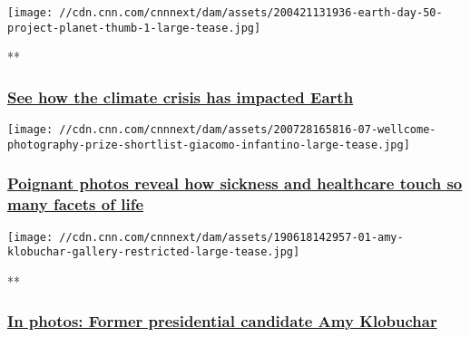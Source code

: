 \href{/videos/weather/2020/04/20/earth-day-50-project-planet-orig.cnn}{}

\texttt{[image: //cdn.cnn.com/cnnnext/dam/assets/200421131936-earth-day-50-project-planet-thumb-1-large-tease.jpg]}

**

\hypertarget{see-how-the-climate-crisis-has-impacted-earth}{%
\subsubsection{\texorpdfstring{\href{/videos/weather/2020/04/20/earth-day-50-project-planet-orig.cnn}{See
how the climate crisis has impacted
Earth}}{See how the climate crisis has impacted Earth}}\label{see-how-the-climate-crisis-has-impacted-earth}}

\href{/style/article/wellcome-photography-prize-shortlist-wellness/index.html}{}

\texttt{[image: //cdn.cnn.com/cnnnext/dam/assets/200728165816-07-wellcome-photography-prize-shortlist-giacomo-infantino-large-tease.jpg]}

\hypertarget{poignant-photos-reveal-how-sickness-and-healthcare-touch-so-many-facets-of-life}{%
\subsubsection{\texorpdfstring{\href{/style/article/wellcome-photography-prize-shortlist-wellness/index.html}{Poignant
photos reveal how sickness and healthcare touch so many facets of
life}}{Poignant photos reveal how sickness and healthcare touch so many facets of life}}\label{poignant-photos-reveal-how-sickness-and-healthcare-touch-so-many-facets-of-life}}

\href{/2019/06/18/politics/gallery/amy-klobuchar/index.html}{}

\texttt{[image: //cdn.cnn.com/cnnnext/dam/assets/190618142957-01-amy-klobuchar-gallery-restricted-large-tease.jpg]}

**

\hypertarget{in-photos-former-presidential-candidate-amy-klobuchar}{%
\subsubsection{\texorpdfstring{\href{/2019/06/18/politics/gallery/amy-klobuchar/index.html}{In
photos: Former presidential candidate Amy
Klobuchar}}{In photos: Former presidential candidate Amy Klobuchar}}\label{in-photos-former-presidential-candidate-amy-klobuchar}}

